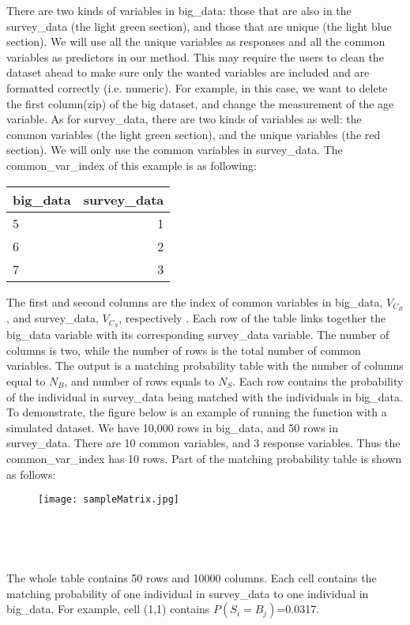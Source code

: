 There are two kinds of variables in big\_data: those that are also in the survey\_data (the light green section), and those that are unique (the light blue section). We will use all the unique variables as responses and all the common variables as predictors in our method. This may require the users to clean the dataset ahead to make sure only the wanted variables are included and are formatted correctly (i.e. numeric). For example, in this case, we want to delete the first column(zip) of the big dataset, and change the measurement of the age variable. As for survey\_data, there are two kinds of variables as well: the common variables (the light green section), and the unique variables (the red section). We will only use the common variables in survey\_data.
The common\_var\_index of this example is as following:

\begin{table}[h!]
\centering
\begin{tabular}{l|r}
big\_data & survey\_data\\\hline
5 & 1\\
6 & 2\\
7 & 3
\end{tabular}
\end{table}

The first and second columns are the index of common variables in big\_data, $V_{C_{B}}$, and survey\_data, $V_{C_{S}}$, respectively . Each row of the table links together the big\_data  variable with its corresponding survey\_data variable.  The number of columns is two, while the number of rows is the total number of common variables.
The output is a matching probability table with the number of columns equal to $N_B$, and number of rows equals to $N_S$. Each row contains the probability of the individual in survey\_data being matched with the individuals in big\_data.
To demonstrate, the figure below is an example of running the function with a simulated dataset. We have 10,000 rows in big\_data, and 50 rows in survey\_data. There are 10 common variables, and 3 response variables. Thus the common\_var\_index has 10 rows. Part of the matching probability table is shown as follows:
\begin{figure}[h!]
\centering
\texttt{[image: sampleMatrix.jpg]}
\end{figure}
\

\

The whole table contains 50 rows and 10000 columns. Each cell contains the matching probability of one individual in survey\_data to one individual in big\_data. For example, cell (1,1) contains $P(S_i = B_j) $=0.0317.


